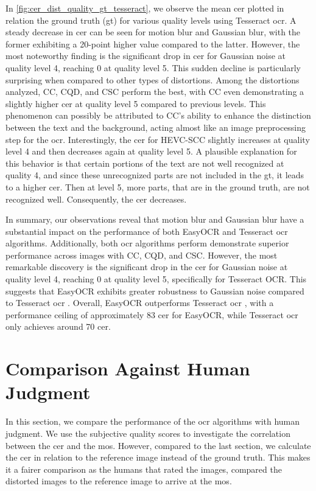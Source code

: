 In \autoref{fig:cer_dist_quality_gt_tesseract}, we observe the mean \gls{cer} plotted in relation the ground truth (\gls{gt}) for various quality levels using Tesseract \gls{ocr}.
A steady decrease in \gls{cer} can be seen for motion blur and Gaussian blur, with the former exhibiting a 20-point higher value compared to the latter.
However, the most noteworthy finding is the significant drop in \gls{cer} for Gaussian noise at quality level 4, reaching 0 at quality level 5.
This sudden decline is particularly surprising when compared to other types of distortions.
Among the distortions analyzed, CC, CQD, and CSC perform the best, with CC even demonstrating a slightly higher \gls{cer} at quality level 5 compared to previous levels.
This phenomenon can possibly be attributed to CC's ability to enhance the distinction between the text and the background, acting almost like an image preprocessing step for the \gls{ocr}.
Interestingly, the \gls{cer} for HEVC-SCC slightly increases at quality level 4 and then decreases again at quality level 5.
A plausible explanation for this behavior is that certain portions of the text are not well recognized at quality 4, and since these unrecognized parts are not included in the \gls{gt}, it leads to a higher \gls{cer}.
Then at level 5, more parts, that are in the ground truth, are not recognized well.
Consequently, the \gls{cer} decreases.

In summary, our observations reveal that motion blur and Gaussian blur have a substantial impact on the performance of both EasyOCR and Tesseract \gls{ocr} algorithms.
Additionally, both \gls{ocr} algorithms perform demonstrate superior performance across images with CC, CQD, and CSC.
However, the most remarkable discovery is the significant drop in the \gls{cer} for Gaussian noise at quality level 4, reaching 0 at quality level 5, specifically for Tesseract OCR.
This suggests that EasyOCR exhibits greater robustness to Gaussian noise compared to Tesseract \gls{ocr} .
Overall, EasyOCR outperforms Tesseract \gls{ocr} , with a performance ceiling of approximately 83 \gls{cer} for EasyOCR, while Tesseract \gls{ocr} only achieves around 70 \gls{cer}.

\section{Comparison Against Human Judgment}
\label{sec:comparison_against_human_judgment}

In this section, we compare the performance of the \gls{ocr} algorithms with human judgment.
We use the subjective quality scores to investigate the correlation between the \gls{cer} and the \gls{mos}.
However, compared to the last section, we calculate the \gls{cer} in relation to the reference image instead of the ground truth.
This makes it a fairer comparison as the humans that rated the images, compared the distorted images to the reference image to arrive at the \gls{mos}.


